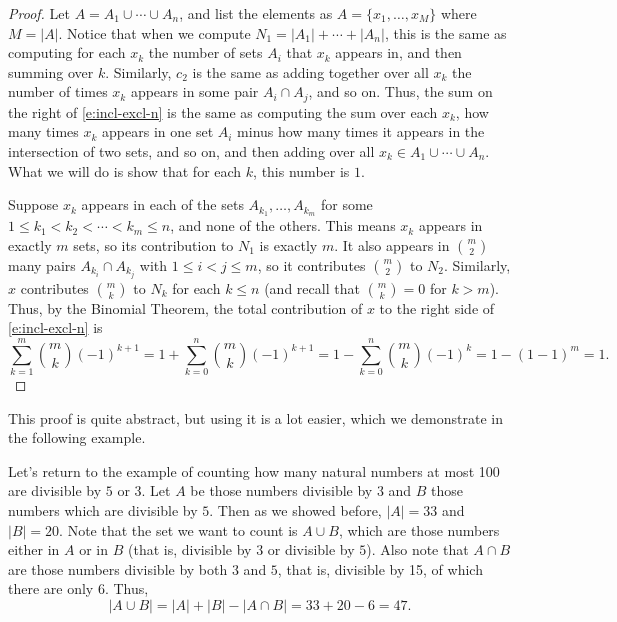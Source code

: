 \documentclass[11pt,dvipsnames]{book}
\numberwithin{equation}{section} %
\numberwithin{figure}{section} %
\numberwithin{table}{section} %
\begin{document}
\begin{proof}
Let $A=A_{1}\cup\cdots \cup A_{n}$, and list the elements as $A=\{x_{1}, \dots ,x_{M}\}$ where $M=|A|$. Notice that when we compute $N_1=|A_{1}|+\cdots + |A_{n}|$, this is the same as computing for each $x_k$ the number of sets $A_i$ that $x_k$ appears in, and then summing over $k$. Similarly, $c_2$ is the same as adding together over all $x_k$ the number of times $x_k$ appears in some pair $A_i\cap A_j$, and so on. Thus, the sum on the right of \eqref{e:incl-excl-n} is the same as computing the sum over each $x_k$,  how many times $x_k$ appears in one set $A_i$ minus how many times it appears in the intersection of two sets, and so on, and then adding over all $x_k\in A_{1}\cup\cdots \cup A_{n}$. What we will do is show that for each $k$, this number is $1$.

Suppose $x_k$ appears in each of the sets $A_{k_{1}}, \dots ,A_{k_{m}}$ for some $1\leq k_1<k_2<\cdots < k_m\leq n$, and none of the others. This means $x_k$ appears in exactly $m$ sets, so its contribution to $N_{1}$ is exactly $m$. It also appears in ${m\choose 2}$ many pairs $A_{k_{i}}\cap A_{k_{j}}$ with $1\leq i<j\leq m$, so it contributes ${m\choose 2}$  to $N_2$. Similarly, $x$ contributes ${m\choose k}$  to $N_k$ for each $k\leq n$ (and recall that ${m\choose k}=0$ for $k>m$). Thus, by the Binomial Theorem, the total contribution of $x$ to the right side of \eqref{e:incl-excl-n} is 
\[
\sum_{k=1}^{m} {m\choose k}(-1)^{k+1}
=1 + \sum_{k=0}^{n} {m\choose k}(-1)^{k+1}
=1 -\sum_{k=0}^{n} {m\choose k}(-1)^{k}
=1-(1-1)^{m}=1.
\]



\end{proof}

This proof is quite abstract, but using it is a lot easier, which we demonstrate in the following example.

\begin{example}
Let's return to the example of counting how many natural numbers at most 100 are divisible by $5$ or $3$. Let $A$ be those numbers divisible by $3$ and $B$ those numbers which are divisible by $5$. Then as we showed before, $|A|=33$ and $|B|=20$. Note that the set we want to count is $A\cup B$, which are those numbers either in $A$ or in $B$ (that is, divisible by $3$ or divisible by $5$). Also note that $A\cap B$ are those numbers divisible by both $3$ and $5$, that is, divisible by 15, of which there are only $6$. Thus, 
\[
|A\cup B|=|A|+|B|-|A\cap B|=33+20-6 = 47.
\]
\end{example}
\end{document}
